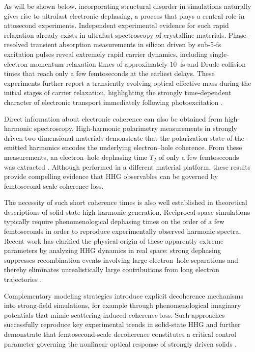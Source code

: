 As will be shown below, incorporating structural disorder in simulations naturally gives rise to ultrafast electronic dephasing, a process that plays a central role in attosecond experiments. Independent experimental evidence for such rapid relaxation already exists in ultrafast spectroscopy of crystalline materials. Phase-resolved transient absorption measurements in silicon driven by sub-5-fs excitation pulses reveal extremely rapid carrier dynamics, including single-electron momentum relaxation times of approximately $10$~fs and Drude collision times that reach only a few femtoseconds at the earliest delays. These experiments further report a transiently evolving optical effective mass during the initial stages of carrier relaxation, highlighting the strongly time-dependent character of electronic transport immediately following photoexcitation \cite{Worle2021}.

Direct information about electronic coherence can also be obtained from high-harmonic spectroscopy. High-harmonic polarimetry measurements in strongly driven two-dimensional materials demonstrate that the polarization state of the emitted harmonics encodes the underlying electron--hole coherence. From these measurements, an electron--hole dephasing time $T_2$ of only a few femtoseconds was extracted \cite{Heide:22}. Although performed in a different material platform, these results provide compelling evidence that HHG observables can be governed by femtosecond-scale coherence loss.

The necessity of such short coherence times is also well established in theoretical descriptions of solid-state high-harmonic generation. Reciprocal-space simulations typically require phenomenological dephasing times on the order of a few femtoseconds in order to reproduce experimentally observed harmonic spectra. Recent work has clarified the physical origin of these apparently extreme parameters by analyzing HHG dynamics in real space: strong dephasing suppresses recombination events involving large electron--hole separations and thereby eliminates unrealistically large contributions from long electron trajectories \cite{PhysRevResearch.6.043005}.

Complementary modeling strategies introduce explicit decoherence mechanisms into strong-field simulations, for example through phenomenological imaginary potentials that mimic scattering-induced coherence loss. Such approaches successfully reproduce key experimental trends in solid-state HHG and further demonstrate that femtosecond-scale decoherence constitutes a critical control parameter governing the nonlinear optical response of strongly driven solids \cite{PhysRevA.103.063109}.

